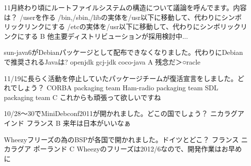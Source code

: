 %

\santaku
{11月終わり頃にルートファイルシステムの構造について議論を呼んでます。内容は？}
{/userを作る}
{/bin,/sbin,/libの実体を/usr以下に移動して、代わりにシンボリックリンクにする}
{/etcの実体を/usr以下に移動して、代わりにシンボリックリンクにする}
{B}
{他主要ディストリビューションが採用検討中...}

\santaku
{sun-java6がDebianパッケージとして配布できなくなりました。代わりにDebianで推奨されるJavaは?}
{openjdk}
{gcj-jdk}
{coco-java}
{A}
{残念だ＞○racle}

\santaku
{11/19に長らく活動を停止していたパッケージチームが復活宣言をしました。どれでしょう？}
{CORBA packaging team}
{Ham-radio packaging team}
{SDL packaging team}
{C}
{これからも頑張って欲しいですね}

\santaku
{10/28〜30でMiniDebconf2011が開かれました。どこの国でしょう？}
{ニカラグア}
{インド}
{フランス}
{B}
{来年は日本がいいなぁ}

\santaku
{Wheezyフリーズの為のBSPが各国で開かれました。ドイツとどこ？}
{フランス}
{ニカラグア}
{ポーランド}
{C}
{Wheezyのフリーズは2012/6なので、開発作業はお早めに}

